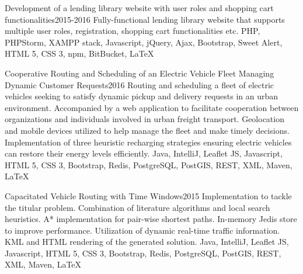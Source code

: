 \begin{projects}
	\project
	{Development of a lending library website with user roles and shopping cart functionalities}{2015-2016}
	{}
	{Fully-functional lending library website that supports multiple user roles, registration, shopping cart functionalities etc.}
	{PHP, PHPStorm, XAMPP stack, Javascript, jQuery, Ajax, Bootstrap, Sweet Alert, HTML 5, CSS 3, npm, BitBucket, \LaTeX}

	\project
	{Cooperative Routing and Scheduling of an Electric Vehicle Fleet Managing Dynamic Customer Requests}{2016}
	{   }
	{Routing and scheduling a fleet of electric vehicles seeking to satisfy dynamic pickup and delivery requests in an urban environment. Accompanied by a web application to facilitate cooperation between organizations and individuals involved in urban freight transport. Geolocation and mobile devices utilized to help manage the fleet and make timely decisions. Implementation of three heuristic recharging strategies ensuring electric vehicles can restore their energy levels efficiently.}
	{Java, IntelliJ, Leaflet JS, Javascript, HTML 5, CSS 3, Bootstrap, Redis, PostgreSQL, PostGIS, REST, XML, Maven, \LaTeX}

	\project
	{Capacitated Vehicle Routing with Time Windows}{2015}
	{ }
	{Implementation to tackle the titular problem. Combination of literature algorithms and local search heuristics. A* implementation for pair-wise shortest paths. In-memory Jedis store to improve performance. Utilization of dynamic real-time traffic information. KML and HTML rendering of the generated solution.}
	{Java, IntelliJ, Leaflet JS, Javascript, HTML 5, CSS 3, Bootstrap, Redis, PostgreSQL, PostGIS, REST, XML, Maven, \LaTeX}

\end{projects}
